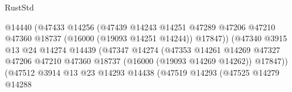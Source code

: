 \begin{lexlean}{RustStd}
\begin{coremodule}
                                                  @14440
                                                  (@47433
                                                    @14256
                                                    (@47439
                                                      @14243
                                                      @14251
                                                      @47289
                                                      @47206
                                                      @47210
                                                      @47360
                                                      @18737
                                                      (@16000 (@19093 @14251 @14244))
                                                      @17847))
                                                  (@47340
                                                    @3915
                                                    @13
                                                    @24
                                                    @14274
                                                    @14439
                                                    (@47347
                                                      @14274
                                                      (@47353
                                                        @14261
                                                        @14269
                                                        @47327
                                                        @47206
                                                        @47210
                                                        @47360
                                                        @18737
                                                        (@16000 (@19093 @14269 @14262))
                                                        @17847))
                                                    (@47512
                                                      @3914
                                                      @13
                                                      @23
                                                      @14293
                                                      @14438
                                                      (@47519
                                                        @14293
                                                        (@47525
                                                          @14279
                                                          @14288

\end{coremodule}
\end{lexlean}
